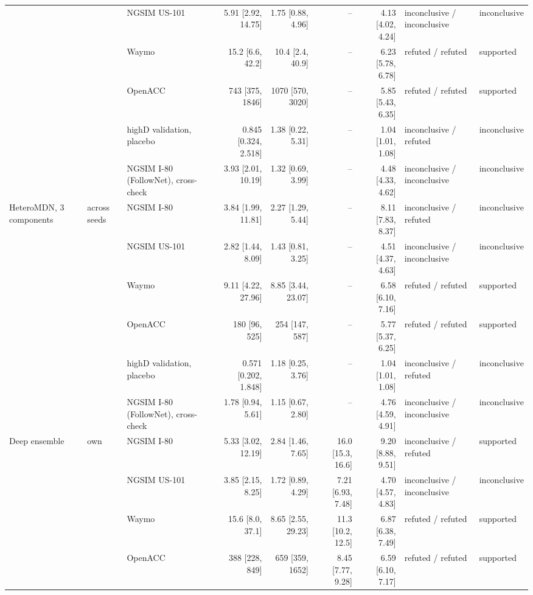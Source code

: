 \begin{longtable}{lllrrrrll}
 &  & NGSIM US-101 & 5.91 [2.92, 14.75] & 1.75 [0.88, 4.96] & -- & 4.13 [4.02, 4.24] & inconclusive / inconclusive & inconclusive \\
 &  & Waymo & 15.2 [6.6, 42.2] & 10.4 [2.4, 40.9] & -- & 6.23 [5.78, 6.78] & refuted / refuted & supported \\
 &  & OpenACC & 743 [375, 1846] & 1070 [570, 3020] & -- & 5.85 [5.43, 6.35] & refuted / refuted & supported \\
 &  & highD validation, placebo & 0.845 [0.324, 2.518] & 1.38 [0.22, 5.31] & -- & 1.04 [1.01, 1.08] & inconclusive / refuted & inconclusive \\
 &  & NGSIM I-80 (FollowNet), cross-check & 3.93 [2.01, 10.19] & 1.32 [0.69, 3.99] & -- & 4.48 [4.33, 4.62] & inconclusive / inconclusive & inconclusive \\
\midrule
HeteroMDN, 3 components & across seeds & NGSIM I-80 & 3.84 [1.99, 11.81] & 2.27 [1.29, 5.44] & -- & 8.11 [7.83, 8.37] & inconclusive / refuted & inconclusive \\
 &  & NGSIM US-101 & 2.82 [1.44, 8.09] & 1.43 [0.81, 3.25] & -- & 4.51 [4.37, 4.63] & inconclusive / inconclusive & inconclusive \\
 &  & Waymo & 9.11 [4.22, 27.96] & 8.85 [3.44, 23.07] & -- & 6.58 [6.10, 7.16] & refuted / refuted & supported \\
 &  & OpenACC & 180 [96, 525] & 254 [147, 587] & -- & 5.77 [5.37, 6.25] & refuted / refuted & supported \\
 &  & highD validation, placebo & 0.571 [0.202, 1.848] & 1.18 [0.25, 3.76] & -- & 1.04 [1.01, 1.08] & inconclusive / refuted & inconclusive \\
 &  & NGSIM I-80 (FollowNet), cross-check & 1.78 [0.94, 5.61] & 1.15 [0.67, 2.80] & -- & 4.76 [4.59, 4.91] & inconclusive / inconclusive & inconclusive \\
\midrule
Deep ensemble & own & NGSIM I-80 & 5.33 [3.02, 12.19] & 2.84 [1.46, 7.65] & 16.0 [15.3, 16.6] & 9.20 [8.88, 9.51] & inconclusive / refuted & supported \\
 &  & NGSIM US-101 & 3.85 [2.15, 8.25] & 1.72 [0.89, 4.29] & 7.21 [6.93, 7.48] & 4.70 [4.57, 4.83] & inconclusive / inconclusive & inconclusive \\
 &  & Waymo & 15.6 [8.0, 37.1] & 8.65 [2.55, 29.23] & 11.3 [10.2, 12.5] & 6.87 [6.38, 7.49] & refuted / refuted & supported \\
 &  & OpenACC & 388 [228, 849] & 659 [359, 1652] & 8.45 [7.77, 9.28] & 6.59 [6.10, 7.17] & refuted / refuted & supported \\

\end{longtable}
